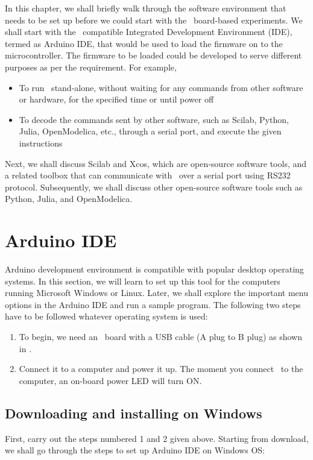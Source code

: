 In this chapter, we shall briefly walk through the software
environment that needs to be set up before we could start with the
\arduino\ board-based experiments. We shall start with the \arduino\
compatible Integrated Development Environment (IDE), termed as Arduino
IDE, that would be used to load the firmware on to the
microcontroller. The firmware to be loaded could be developed to serve
different purposes as per the requirement. For example, 
\begin{itemize}
      \item To run \arduino\ stand-alone, without waiting for any commands
            from other software or hardware, for the specified time or until
            power off
      \item To decode the commands sent by other software, such as Scilab, Python, 
            Julia, OpenModelica, etc., through a serial port, and 
            execute the given instructions %
\end{itemize}
Next, we shall discuss Scilab and Xcos, which are open-source software
tools, and a related toolbox that can communicate with \arduino\ 
over a serial port using RS232 protocol. Subsequently, we shall discuss 
other open-source software tools such as Python, Julia, and OpenModelica. 

\section{Arduino IDE}\label{arduino-ide}
\label{sec:ard-start}
Arduino development environment is compatible with popular desktop
operating systems. In this section, we will learn to set up this tool
for the computers running Microsoft Windows or Linux. Later, we shall
explore the important menu options in the Arduino IDE and run a sample
program.  The following two steps have to be followed whatever operating
system is used:

\begin{enumerate}
      \item To begin, we need an \arduino\ board with a USB cable (A plug to
            B plug) as shown in .
      \item Connect it to a computer and power it up. The moment you connect \arduino\
            to the computer, an on-board power LED will turn ON.
\end{enumerate}

\subsection{Downloading and installing on Windows}
First, carry out the steps numbered 1 and 2 given above.
Starting from download, we shall go through the steps to set up
Arduino IDE on Windows OS:

